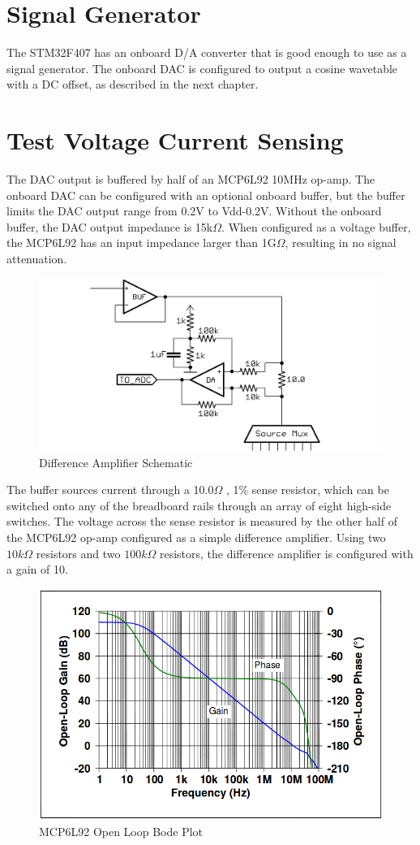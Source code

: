 \documentclass[11pt,twoside]{mitthesis}
\newcommand{\ohm}{$\Omega$ }
\begin{document}
\section{Signal Generator}

The STM32F407 has an onboard D/A converter that is good enough to use as a signal generator.
The onboard DAC is configured to output a cosine wavetable with a DC offset, as described in the next chapter.

\section{Test Voltage Current Sensing}

The DAC output is buffered by half of an MCP6L92 10MHz op-amp.
The onboard DAC can be configured with an optional onboard buffer, but the buffer limits the DAC output range from 0.2V to Vdd-0.2V.
Without the onboard buffer, the DAC output impedance is 15k$\Omega$.
When configured as a voltage buffer, the MCP6L92 has an input impedance larger than 1G$\Omega$, resulting in no signal attenuation.

\begin{figure}[h!]
  \begin{center}
      \includegraphics[width=.7\textwidth]{../DA.png}
      \caption{Difference Amplifier Schematic}
  \end{center}
\end{figure}

The buffer sources current through a 10.0\ohm, 1\% sense resistor, which can be switched onto any of the breadboard rails through an array of eight high-side switches.
The voltage across the sense resistor is measured by the other half of the MCP6L92 op-amp configured as a simple difference amplifier.
Using two $10k\Omega$ resistors and two $100k\Omega$ resistors, the difference amplifier is configured with a gain of 10.  

\begin{figure}[h!]
  \begin{center}
      \includegraphics[width=.6\textwidth]{../opamp-bode.png}
      \caption{MCP6L92 Open Loop Bode Plot}
  \end{center}
\end{figure}
\end{document}
